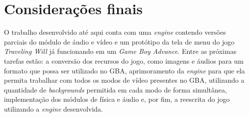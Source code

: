 \chapter[Considerações finais]{Considerações finais}

O trabalho desenvolvido até aqui conta com uma \textit{engine} contendo versões parciais do módulo de áudio e vídeo e um protótipo da tela de menu do jogo \textit{Traveling Will} já funcionando em um \textit{Game Boy Advance}. Entre as próximas tarefas estão: a conversão dos recursos do jogo, como imagens e áudios para um formato que possa ser utilizado no GBA, aprimoramento da \textit{engine} para que ela permita trabalhar com todos os modos de vídeo presentes no GBA, utilizando a quantidade de \textit{backgrounds} permitida em cada modo de forma simultânea, implementação dos módulos de física e áudio e, por fim, a reescrita do jogo utilizando a \textit{engine} desenvolvida.
